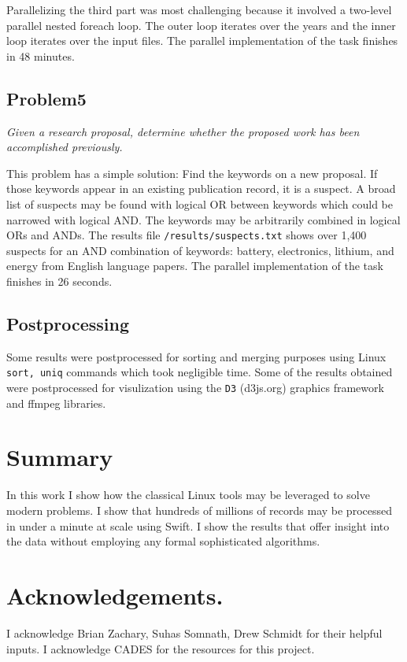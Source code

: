 \documentclass{article}
\begin{document}
Parallelizing the third part was most challenging because it involved a
two-level parallel nested foreach loop.  The outer loop iterates over the years
and the inner loop iterates over the input files. The parallel implementation
of the task finishes in 48 minutes.

\subsection*{Problem5}
\textit{Given a research proposal, determine whether the proposed work has been
accomplished previously.}

This problem has a simple solution: Find the keywords on a new proposal. If
those keywords appear in an existing publication record, it is a suspect. A
broad list of suspects may be found with logical OR between keywords which
could be narrowed with logical AND. The keywords may be arbitrarily combined in
logical ORs and ANDs. The results file \texttt{/results/suspects.txt} shows
over 1,400 suspects for an AND combination of keywords:  battery, electronics,
lithium, and energy from English language papers. The parallel implementation
of the task finishes in 26 seconds.

\subsection*{Postprocessing}
Some results were postprocessed for sorting and merging purposes using Linux
\texttt{sort, uniq} commands which took negligible time. Some of the results
obtained were postprocessed for visulization using the \texttt{D3} (d3js.org)
graphics framework and ffmpeg libraries.


\section*{Summary}
In this work I show how the classical Linux tools may be leveraged to solve
modern problems. I show that hundreds of millions of records may be processed
in under a minute at scale using Swift. I show the results that offer insight
into the data without employing any formal sophisticated algorithms.

\section*{Acknowledgements.}
I acknowledge Brian Zachary, Suhas Somnath, Drew Schmidt for their helpful
inputs. I acknowledge CADES for the resources for this project.
\end{document}
